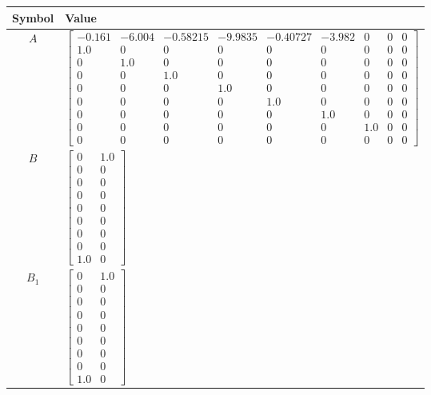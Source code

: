 \begin{tabular}{cl}
\hline
  Symbol  & Value                                                                                                                                                                                                                                                                                                                                                                                                               \\
\hline
   $A$    & $\left[\begin{matrix}-0.161 & -6.004 & -0.58215 & -9.9835 & -0.40727 & -3.982 & 0 & 0 & 0\\1.0 & 0 & 0 & 0 & 0 & 0 & 0 & 0 & 0\\0 & 1.0 & 0 & 0 & 0 & 0 & 0 & 0 & 0\\0 & 0 & 1.0 & 0 & 0 & 0 & 0 & 0 & 0\\0 & 0 & 0 & 1.0 & 0 & 0 & 0 & 0 & 0\\0 & 0 & 0 & 0 & 1.0 & 0 & 0 & 0 & 0\\0 & 0 & 0 & 0 & 0 & 1.0 & 0 & 0 & 0\\0 & 0 & 0 & 0 & 0 & 0 & 1.0 & 0 & 0\\0 & 0 & 0 & 0 & 0 & 0 & 0 & 0 & 0\end{matrix}\right]$ \\
   $B$    & $\left[\begin{matrix}0 & 1.0\\0 & 0\\0 & 0\\0 & 0\\0 & 0\\0 & 0\\0 & 0\\0 & 0\\1.0 & 0\end{matrix}\right]$                                                                                                                                                                                                                                                                                                          \\
 $B_{1}$  & $\left[\begin{matrix}0 & 1.0\\0 & 0\\0 & 0\\0 & 0\\0 & 0\\0 & 0\\0 & 0\\0 & 0\\1.0 & 0\end{matrix}\right]$                                                                                                                                                                                                                                                                                                          \\

\end{tabular}

